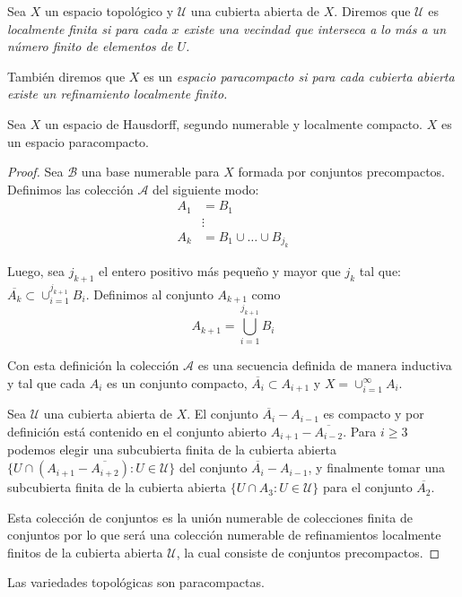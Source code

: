 \begin{definition}
  Sea $X$ un espacio topológico y $\mathcal{U}$ una cubierta abierta de $X$. Diremos que $\mathcal{U}$  es \it{localmente finita} si para cada $x$ existe una vecindad que interseca a lo más a un número finito de elementos de $U$.

  También diremos que $X$ es un \it{espacio paracompacto} si para cada cubierta abierta existe un refinamiento localmente finito. 
\end{definition}

\begin{theorem}  \label{Teorema: Espacios Precompactos}
 Sea $X$ un espacio de Hausdorff, segundo numerable y localmente compacto. $X$ es un espacio paracompacto.
\end{theorem}

\begin{proof}
  Sea $\mathcal{B}$ una base numerable para $X$ formada por conjuntos precompactos. Definimos las colección $\mathcal{A}$ del siguiente modo:
  \begin{align*}
    A_1 &= B_1\\
    &\vdots\\
    A_k &= B_1 \cup \dots \cup B_{j_k}
  \end{align*}

  Luego, sea $j_{k+1}$ el entero positivo más pequeño y mayor que $j_k$ tal que: $\overline{A_k} \subset \cup_{i=1}^{j_{k+1}} B_i$. Definimos al conjunto $A_{k+1}$ como
  \[
    A_{k+1} = \bigcup_{i=1}^{j_{k+1}} B_i
  \]

  Con esta definición la colección $\mathcal{A}$ es una secuencia definida de manera inductiva y tal que cada $A_i$ es un conjunto compacto, $\overline{A_i} \subset A_{i+1}$ y $X = \cup_{i=1}^{\infty} A_i$.

  Sea $\mathcal{U}$ una cubierta abierta de $X$. El conjunto $\overline{A_i} - A_{i-1}$ es compacto y por definición está contenido en el conjunto abierto $A_{i+1} - \overline{A_{i-2}}$. Para $i \geq 3$ podemos elegir una subcubierta finita de la cubierta abierta $\{U \cap (A_{i+1} - \overline{A_{i+2}}) : U \in \mathcal{U} \}$ del conjunto $\overline{A_{i}} - A_{i-1}$, y finalmente tomar una subcubierta finita de la cubierta abierta $\{U \cap A_3: U \in \mathcal{U}\}$ para el conjunto $\overline{A_2}$.

Esta colección de conjuntos es la unión numerable de colecciones finita de conjuntos por lo que será una colección numerable de refinamientos localmente finitos de la cubierta abierta $\mathcal{U}$, la cual consiste de conjuntos precompactos.
\end{proof}

\begin{corollary} \label{Corolario: Variedades Precompactas}
  Las variedades topológicas son paracompactas.
\end{corollary}
